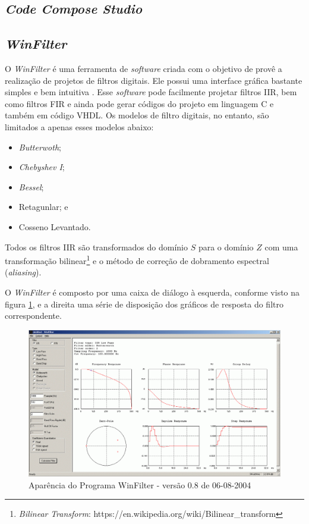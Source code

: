 	\subsection{\textit{Code Compose Studio}}
		
	\subsection{\textit{WinFilter}}
	
		O \textit{WinFilter} é uma ferramenta de \textit{software} criada com o objetivo de provê a realização de projetos de filtros digitais. Ele possui uma interface gráfica bastante simples e bem intuitiva \cite{Kundert2004}. Esse \textit{software} pode facilmente projetar filtros IIR, bem como filtros FIR e ainda pode gerar códigos do projeto em linguagem C e também em código VHDL. Os modelos de filtro digitais, no entanto, são limitados a apenas esses modelos abaixo:
		
		\begin{itemize}
			\item \textit{Butterwoth};
			\item \textit{Chebyshev I};
			\item \textit{Bessel};
			\item Retagunlar; e
			\item Cosseno Levantado.
		\end{itemize}
		
		Todos os filtros IIR são transformados do domínio $ S $ para o domínio $ Z $ com uma transformação bilinear\footnote{\textit{Bilinear} \textit{Transform}: https://en.wikipedia.org/wiki/Bilinear\_transform} e o método de correção de dobramento espectral (\textit{aliasing}).
	
		O \textit{WinFilter} é composto por uma caixa de diálogo à esquerda, conforme visto na figura \ref{fig-winfilter-window}, e a direita uma série de disposição dos gráficos de resposta do filtro correspondente.
		
		\begin{figure}[!ht]
			\label{fig-winfilter-window}
			\centering
			\includegraphics[scale=0.3]{./figuras/winfilterwindow.png}
			\caption{Aparência do Programa WinFilter - versão 0.8 de  06-08-2004}
		\end{figure}
	
